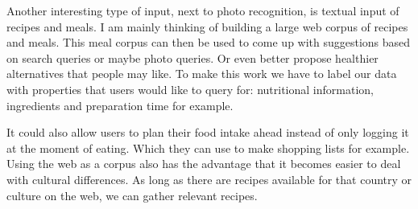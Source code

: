 \documentclass[a4paper]{scrartcl}
\begin{document}
Another interesting type of input, next to photo recognition, is textual input of recipes and meals. I am mainly thinking of building a large web corpus of recipes and meals. This meal corpus can then be used to come up with suggestions based on search queries or maybe photo queries. Or even better propose healthier alternatives that people may like. To make this work we have to label our data with properties that users would like to query for: nutritional information, ingredients and preparation time for example. 

It could also allow users to plan their food intake ahead instead of only logging it at the moment of eating. Which they can use to make shopping lists for example. Using the web as a corpus also has the advantage that it becomes easier to deal with cultural differences. As long as there are recipes available for that country or culture on the web, we can gather relevant recipes. 
\end{document}
